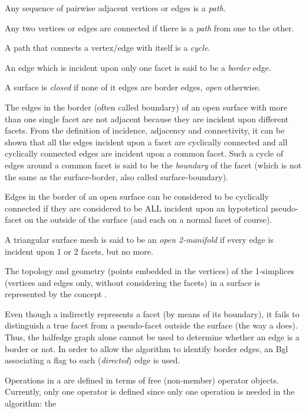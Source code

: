 Any sequence of pairwise adjacent vertices or edges is a {\em path}.

Any two vertices or edges are connected if there is a {\em path} from one to the other.

A path that connects a vertex/edge with itself is a {\em cycle}.

An edge which is incident upon only one facet is said to be a {\em border} edge. 

A surface is {\em closed} if none of it edges are border edges, {\em open} otherwise.

The edges in the border (often called boundary) of an open surface with more than one single facet are not adjacent because they are incident upon different facets. From the definition of incidence, adjacency and connectivity, it can be shown that all the edges incident upon a facet are cyclically connected and all cyclically connected edges are incident upon a common facet. Such a cycle of edges around a common facet is said to be the {\em boundary} of the facet (which is not the same as the surface-border, also called surface-boundary).

Edges in the border of an open surface can be considered to be cyclically connected if they are considered to be ALL  incident upon an hypotetical pseudo-facet on the outside of the surface (and each on a normal facet of course).

A triangular surface mesh is said to be an {\em open 2-manifold} if every edge is incident upon 1 or 2 facets, but no more.

The topology and geometry (points embedded in the vertices) of the 1-simplices (vertices and edges only, without considering the facets) in a surface is represented by the concept .

Even though a  indirectly represents a facet (by means of its boundary), it fails to distinguish a true facet from a pseudo-facet outside the surface (the way a  does). Thus, the halfedge graph alone cannot be used to determine whether an edge is a border or not. In order to allow the algorithm to identify border edges, an {\sc Bgl}  associating a  flag to each ({\em directed}) edge is used.

Operations in a  are defined in terms of free (non-member) operator objects. Currently, only one operator is defined since only one operation is needed in the algorithm: the 
 
